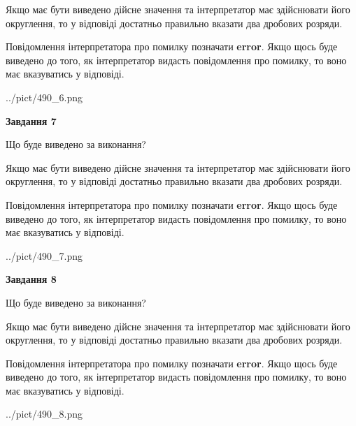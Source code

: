 \documentclass[12pt, ukrainian]{article}
\begin{document}
{\begin {Large}
Якщо має бути виведено дійсне значення та інтерпретатор має здійснювати його округлення, 
то у відповіді достатньо правильно вказати два дробових розряди.

Повідомлення інтерпретатора про помилку позначати \textbf{error}.
Якщо щось буде виведено до того, як інтерпретатор видасть повідомлення про помилку, 
то воно має вказуватись у відповіді. \par

\begin{center}
	{../pict/490_6.png}
\end{center}
\newpage

{\begin {center}\textbf{Завдання 7}\end {center}}\par
Що буде виведено за виконання? \par

Якщо має бути виведено дійсне значення та інтерпретатор має здійснювати його округлення, 
то у відповіді достатньо правильно вказати два дробових розряди.

Повідомлення інтерпретатора про помилку позначати \textbf{error}.
Якщо щось буде виведено до того, як інтерпретатор видасть повідомлення про помилку, 
то воно має вказуватись у відповіді. \par

\begin{center}
	{../pict/490_7.png}
\end{center}
\newpage

{\begin {center}\textbf{Завдання 8}\end {center}}\par
Що буде виведено за виконання? \par

Якщо має бути виведено дійсне значення та інтерпретатор має здійснювати його округлення, 
то у відповіді достатньо правильно вказати два дробових розряди.

Повідомлення інтерпретатора про помилку позначати \textbf{error}.
Якщо щось буде виведено до того, як інтерпретатор видасть повідомлення про помилку, 
то воно має вказуватись у відповіді. \par

\begin{center}
	{../pict/490_8.png}
\end{center}
\newpage


\end{Large}}
\end{document}
